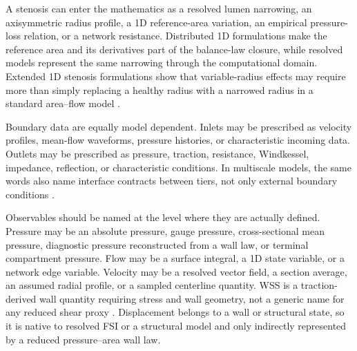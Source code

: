 A stenosis can enter the mathematics as a resolved lumen narrowing, an
axisymmetric radius profile, a 1D reference-area variation, an empirical
pressure-loss relation, or a network resistance. Distributed 1D formulations
make the reference area and its derivatives part of the balance-law closure,
while resolved models represent the same narrowing through the computational
domain. Extended 1D stenosis formulations show that variable-radius effects may
require more than simply replacing a healthy radius with a narrowed radius in a
standard area--flow model \cite{CanicEtAl2024Extended1DStenosis}.

Boundary data are equally model dependent. Inlets may be prescribed as
velocity profiles, mean-flow waveforms, pressure histories, or characteristic
incoming data. Outlets may be prescribed as pressure, traction, resistance,
Windkessel, impedance, reflection, or characteristic conditions. In multiscale
models, the same words also name interface contracts between tiers, not only
external boundary conditions
\cite{QuarteroniVeneziani2003GeometricalMultiscale,ShiEtAl2011BloodFlowModelReview}.

Observables should be named at the level where they are actually defined.
Pressure may be an absolute pressure, gauge pressure, cross-sectional mean
pressure, diagnostic pressure reconstructed from a wall law, or terminal
compartment pressure. Flow may be a surface integral, a 1D state variable, or a
network edge variable. Velocity may be a resolved vector field, a section
average, an assumed radial profile, or a sampled centerline quantity. WSS is a
traction-derived wall quantity requiring stress and wall geometry, not a generic
name for any reduced shear proxy \cite{JohnEtAl2017WallShearStressVectorForm}.
Displacement belongs to a wall or structural state, so it is native to resolved
FSI or a structural model and only indirectly represented by a reduced
pressure--area wall law.

